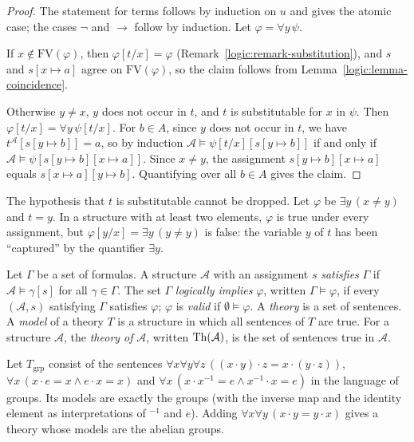 \begin{proof}
The statement for terms follows by induction on $u$ and gives the atomic case;
the cases $\neg$ and $\to$ follow by induction. Let $\varphi = \forall y\,\psi$.

If $x \notin \mathrm{FV}(\varphi)$, then $\varphi[t/x] = \varphi$
(Remark~\ref{logic:remark-substitution}), and $s$ and $s[x \mapsto a]$ agree on
$\mathrm{FV}(\varphi)$, so the claim follows from
Lemma~\ref{logic:lemma-coincidence}.

Otherwise $y \neq x$, $y$ does not occur in $t$, and $t$ is substitutable for
$x$ in $\psi$. Then $\varphi[t/x] = \forall y\,\psi[t/x]$. For $b \in A$, since
$y$ does not occur in $t$, we have $t^{\mathcal{A}}[s[y \mapsto b]] = a$, so by
induction $\mathcal{A} \models \psi[t/x][s[y \mapsto b]]$ if and only if
$\mathcal{A} \models \psi[s[y \mapsto b][x \mapsto a]]$. Since $x \neq y$, the
assignment $s[y \mapsto b][x \mapsto a]$ equals $s[x \mapsto a][y \mapsto b]$.
Quantifying over all $b \in A$ gives the claim.
\end{proof}

\begin{counterexample}\label{logic:counterexample-capture}
The hypothesis that $t$ is substitutable cannot be dropped. Let $\varphi$ be
$\exists y\, (x \neq y)$ and $t = y$. In a structure with at least two
elements, $\varphi$ is true under every assignment, but
$\varphi[y/x] = \exists y\,(y \neq y)$ is false: the variable $y$ of $t$ has
been ``captured'' by the quantifier $\exists y$.
\end{counterexample}

\begin{definition}\label{logic:definition-model}
Let $\Gamma$ be a set of formulas. A structure $\mathcal{A}$ with an assignment
$s$ \emph{satisfies} $\Gamma$ if $\mathcal{A} \models \gamma[s]$ for all
$\gamma \in \Gamma$. The set $\Gamma$ \emph{logically implies} $\varphi$,
written $\Gamma \models \varphi$, if every $(\mathcal{A}, s)$ satisfying
$\Gamma$ satisfies $\varphi$; $\varphi$ is \emph{valid} if
$\emptyset \models \varphi$. A \emph{theory} is a set of sentences. A
\emph{model} of a theory $T$ is a structure in which all sentences of $T$ are
true. For a structure $\mathcal{A}$, the \emph{theory of} $\mathcal{A}$,
written $\operatorname{Th}(\mathcal{A})$, is the set of sentences true in $\mathcal{A}$.
\end{definition}

\begin{example}\label{logic:example-groups-models}
Let $T_{\mathrm{grp}}$ consist of the sentences
$\forall x \forall y \forall z\, ((x \cdot y) \cdot z = x \cdot (y \cdot z))$,
$\forall x\, (x \cdot e = x \wedge e \cdot x = x)$ and
$\forall x\, (x \cdot x^{-1} = e \wedge x^{-1} \cdot x = e)$ in the language of
groups. Its models are exactly the groups (with the inverse map and the
identity element as interpretations of ${}^{-1}$ and $e$). Adding
$\forall x \forall y\,(x \cdot y = y \cdot x)$ gives a theory whose models are
the abelian groups.
\end{example}

